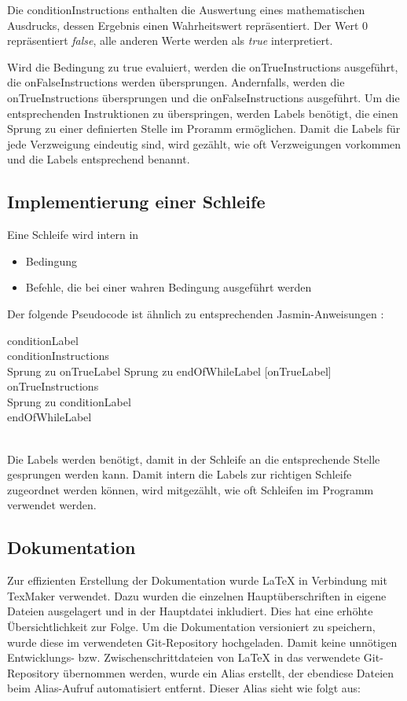 Die conditionInstructions enthalten die Auswertung eines mathematischen Ausdrucks, dessen Ergebnis einen Wahrheitswert repräsentiert. Der Wert 0 repräsentiert \textit{false}, alle anderen Werte werden als \textit{true} interpretiert.
 
Wird die Bedingung zu true evaluiert, werden die onTrueInstructions ausgeführt, die onFalseInstructions werden übersprungen. Andernfalls, werden die onTrueInstructions übersprungen und die onFalseInstructions ausgeführt.
Um die entsprechenden Instruktionen zu überspringen, werden Labels benötigt, die einen Sprung zu einer definierten Stelle im Proramm ermöglichen. Damit die Labels für jede Verzweigung eindeutig sind, wird gezählt, wie oft Verzweigungen vorkommen und die Labels entsprechend benannt.

\subsection{Implementierung einer Schleife}
Eine Schleife wird intern  in
\begin{itemize}
\item Bedingung
\item Befehle, die bei einer wahren Bedingung ausgeführt werden
\end{itemize}

Der folgende Pseudocode ist ähnlich zu entsprechenden Jasmin-Anweisungen :
\\
\begin{algorithm}[H]
	conditionLabel \\
	conditionInstructions \\
		{ 
			Sprung zu onTrueLabel
		}
		{
			Sprung zu endOfWhileLabel
		}
	[onTrueLabel] \\
	onTrueInstructions \\
	Sprung zu conditionLabel \\	
	endOfWhileLabel
\end{algorithm}
\(\)\\
Die Labels werden benötigt, damit in der Schleife an die entsprechende Stelle gesprungen werden kann. Damit intern die Labels zur richtigen Schleife zugeordnet werden können, wird mitgezählt, wie oft Schleifen im Programm verwendet werden.

\subsection{Dokumentation}
Zur effizienten Erstellung der Dokumentation wurde \LaTeX \(\) in Verbindung mit TexMaker verwendet. Dazu wurden die einzelnen Hauptüberschriften in eigene Dateien ausgelagert und in der Hauptdatei inkludiert. Dies hat eine erhöhte Übersichtlichkeit zur Folge.
Um die Dokumentation versioniert zu speichern, wurde diese im verwendeten Git-Repository hochgeladen. Damit keine unnötigen Entwicklungs- bzw. Zwischenschrittdateien von \LaTeX \(\) in das verwendete Git-Repository übernommen werden, wurde ein Alias erstellt, der ebendiese Dateien beim Alias-Aufruf automatisiert entfernt. Dieser Alias sieht wie folgt aus:

